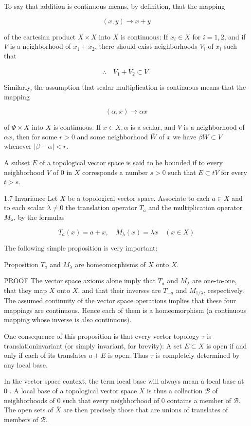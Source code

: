 \documentclass[10pt]{article}
\begin{document}
To say that addition is continuous means, by definition, that the mapping

$$
(x, y) \rightarrow x+y
$$

of the cartesian product $X \times X$ into $X$ is continuous: If $x_{i} \in X$ for $i=1,2$, and if $V$ is a neighborhood of $x_{1}+x_{2}$, there should exist neighborhoods $V_{i}$ of $x_{i}$ such that

$$
\therefore \quad V_{1}+\bar{V}_{2} \subset V .
$$

Similarly, the assumption that scalar multiplication is continuous means that the mapping

$$
(\alpha, x) \rightarrow \alpha x
$$

of $\Phi \times X$ into $X$ is continuous: If $x \in X, \alpha$ is a scalar, and $V$ is a neighborhood of $\alpha x$, then for some $r>0$ and some neighborhood $\bar{W}$ of $x$ we have $\beta W \subset V$ whenever
$|\beta-\alpha|<r$.

A subset $E$ of a topological vector space is said to be bounded if to every neighborhood $V$ of 0 in $X$ corresponds a number $s>0$ such that $E \subset t V$ for every $t>s$.

1.7 Invariance Let $X$ be a topological vector space. Associate to each $a \in X$ and to each scalar $\lambda \neq 0$ the translation operator $T_{a}$ and the multiplication operator $M_{\lambda}$, by the formulas

$$
T_{a}(x)=a+x, \quad M_{\lambda}(x)=\lambda x \quad(x \in X)
$$

The following simple proposition is very important:

Proposition $T_{a}$ and $M_{\lambda}$ are homeomorphisms of $X$ onto $X$.

PROOF The vector space axioms alone imply that $T_{a}$ and $M_{\lambda}$ are one-to-one, that they map $X$ onto $X$, and that their inverses are $T_{-a}$ and $M_{1 / \lambda}$, respectively. The assumed continuity of the vector space operations implies that these four mappings are continuous. Hence each of them is a homeomorphism (a continuous mapping whose inverse is also continuous).

One consequence of this proposition is that every vector topology $\tau$ is translationinvariant (or simply invariant, for brevity): A set $E \subset X$ is open if and only if each of its translates $a+E$ is open. Thus $\tau$ is completely determined by any local base.

In the vector space context, the term local base will always mean a local base at 0 . A local base of a topological vector space $X$ is thus a collection $\mathscr{B}$ of neighborhoods of 0 such that every neighborhood of 0 contains a member of $\mathscr{B}$. The open sets of $\bar{X}$ are then precisely those that are unions of translates of members of $\mathscr{B}$.
\end{document}
